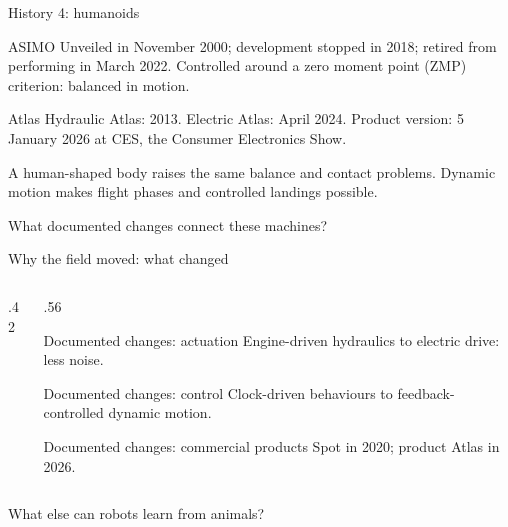 \documentclass[aspectratio=169]{beamer}
\begin{document}
\begin{frame}[t]{History 4: humanoids}
\small
\vspace{-3mm}
\begin{block}{ASIMO}
Unveiled in November 2000; development stopped in 2018; retired from performing in March 2022. Controlled around a zero moment point (ZMP) criterion: balanced in motion.
\end{block}
\vspace{3mm}
\begin{block}{Atlas}
Hydraulic Atlas: 2013. Electric Atlas: April 2024. Product version: 5 January 2026 at CES, the Consumer Electronics Show.
\end{block}
\vspace{3mm}
\small A human-shaped body raises the same balance and contact problems. Dynamic motion makes flight phases and controlled landings possible.
\par\vspace{2mm}\small What documented changes connect these machines?
\end{frame}

\begin{frame}[t]{Why the field moved: what changed}
\small
\vspace{-2mm}
\begin{columns}[T,onlytextwidth]
\begin{column}{.42\textwidth}
\centering
{}
\end{column}
\begin{column}{.56\textwidth}
\begin{block}{Documented changes: actuation}
Engine-driven hydraulics to electric drive: less noise.
\end{block}
\vspace{3mm}
\begin{block}{Documented changes: control}
Clock-driven behaviours to feedback-controlled dynamic motion.
\end{block}
\vspace{3mm}
\begin{block}{Documented changes: commercial products}
Spot in 2020; product Atlas in 2026.
\end{block}
\end{column}
\end{columns}
\par\vspace{2mm} What else can robots learn from animals?
\end{frame}
\end{document}
